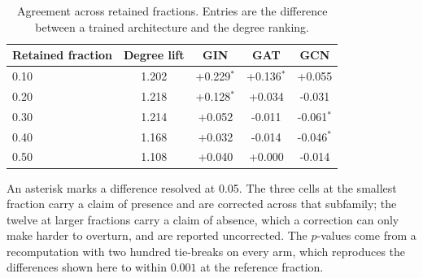 \begin{table}[htbp]
\centering
\caption{Agreement across retained fractions. Entries are the difference between a trained architecture and the degree ranking.}
\label{tab:kfraction}
\small
\setlength{\tabcolsep}{4pt}
\begin{tabular}{lcccc}
\toprule
Retained fraction & Degree lift & GIN & GAT & GCN \\
\midrule
0.10 & 1.202 & +0.229$^{*}$ & +0.136$^{*}$ & +0.055 \\
0.20 & 1.218 & +0.128$^{*}$ & +0.034 & -0.031 \\
0.30 & 1.214 & +0.052 & -0.011 & -0.061$^{*}$ \\
0.40 & 1.168 & +0.032 & -0.014 & -0.046$^{*}$ \\
0.50 & 1.108 & +0.040 & +0.000 & -0.014 \\
\bottomrule
\end{tabular}
\begin{flushleft}\footnotesize An asterisk marks a difference resolved at 0.05. The three cells at the smallest fraction carry a claim of presence and are corrected across that subfamily; the twelve at larger fractions carry a claim of absence, which a correction can only make harder to overturn, and are reported uncorrected. The $p$-values come from a recomputation with two hundred tie-breaks on every arm, which reproduces the differences shown here to within $0.001$ at the reference fraction.\end{flushleft}
\end{table}
